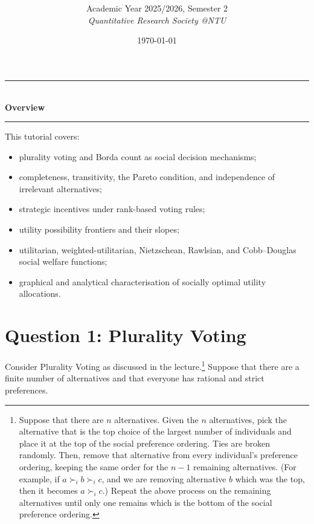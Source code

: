 \documentclass[12pt]{article}
\title{
\CourseCode \CourseName \\[0.3em]
\large \DocType
}
\author{
  Academic Year 2025/2026, Semester 2 \\[0.25em]
  \textit{Quantitative Research Society @NTU}
}
\date{\today}
\begin{document}
\maketitle
\thispagestyle{plainfirst}
\pagestyle{main}
\bigskip

\begin{center}
  \rule{0.8\textwidth}{0.4pt}\\[4pt]
  \textbf{Overview}\\[2pt]
  \rule{0.8\textwidth}{0.4pt}
\end{center}

\noindent
This tutorial covers:
\begin{itemize}[leftmargin=*]
  \item plurality voting and Borda count as social decision mechanisms;
  \item completeness, transitivity, the Pareto condition, and independence of irrelevant alternatives;
  \item strategic incentives under rank-based voting rules;
  \item utility possibility frontiers and their slopes;
  \item utilitarian, weighted-utilitarian, Nietzschean, Rawlsian, and Cobb--Douglas social welfare functions;
  \item graphical and analytical characterisation of socially optimal utility allocations.
\end{itemize}

\bigskip

\newpage
\tableofcontents

\newpage
\section{Question 1: Plurality Voting}

\noindent
Consider Plurality Voting as discussed in the lecture.\footnote{Suppose that there are $n$ alternatives. Given the $n$ alternatives, pick the alternative that is the top choice of the largest number of individuals and place it at the top of the social preference ordering. Ties are broken randomly. Then, remove that alternative from every individual's preference ordering, keeping the same order for the $n-1$ remaining alternatives. (For example, if $a \succ_i b \succ_i c$, and we are removing alternative $b$ which was the top, then it becomes $a \succ_i c$.) Repeat the above process on the remaining alternatives until only one remains which is the bottom of the social preference ordering.} Suppose that there are a finite number of alternatives and that everyone has rational and strict preferences.
\end{document}
